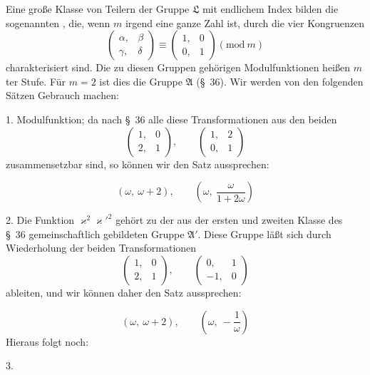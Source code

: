 Eine große Klasse von Teilern der Gruppe $\mathfrak{L}$ mit endlichem
Index bilden die sogenannten , die, wenn
$m$ irgend eine ganze Zahl ist, durch die vier Kongruenzen
\[
\begin{pmatrix} \alpha, & \beta \\ \gamma, & \delta \end{pmatrix} \equiv \begin{pmatrix} 1, & 0 \\ 0, & 1 \end{pmatrix} (\mathrm{mod}\ m)
\]
charakterisiert sind. Die zu diesen Gruppen gehörigen Modulfunktionen
 heißen  $m$ter Stufe. Für $m = 2$
ist dies die Gruppe $\mathfrak{A}$ (\S\ 36). Wir werden von den folgenden
Sätzen Gebrauch machen:

1. 
 Modulfunktion; da nach \S\ 36 alle diese Transformationen
aus den beiden
\[
\begin{pmatrix} 1, & 0 \\ 2, & 1 \end{pmatrix}, \qquad \begin{pmatrix} 1, & 2 \\ 0, & 1 \end{pmatrix}
\]
zusammensetzbar sind, so können wir den Satz aussprechen:

\[
(\omega,\ \omega+2), \qquad \left(\omega,\ \frac{\omega}{1+2\omega}\right)
\]

2. Die Funktion $\varkappa^2\varkappa'^2$ gehört zu der aus der ersten und
zweiten Klasse des \S\ 36 gemeinschaftlich gebildeten Gruppe $\mathfrak{A}'$.
Diese Gruppe läßt sich durch Wiederholung der beiden Transformationen
\[
\begin{pmatrix} 1, & 0 \\ 2, & 1 \end{pmatrix}, \qquad \begin{pmatrix} 0, & 1 \\ -1, & 0 \end{pmatrix}
\]
ableiten, und wir können daher den Satz aussprechen:

\[
(\omega,\ \omega+2), \qquad \left(\omega,\ -\frac{1}{\omega}\right)
\]
Hieraus folgt noch:

3. 
